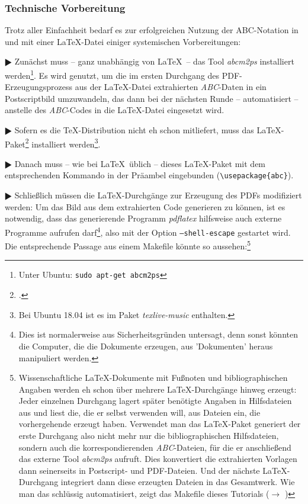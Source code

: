 \subsubsection{Technische Vorbereitung}

Trotz aller Einfachheit bedarf es zur erfolgreichen Nutzung der ABC-Notation
in und mit einer \LaTeX-Datei einiger systemischen Vorbereitungen:

$\RHD$ Zunächst muss -- ganz unabhängig von \LaTeX\ -- das Tool \textit{abcm2ps}
installiert werden\footnote{Unter Ubuntu: \texttt{sudo apt-get abcm2ps}}. Es
wird genutzt, um die im  ersten Durchgang des PDF-Erzeugungsprozess aus der
\LaTeX-Datei extrahierten \textit{ABC}-Daten in ein Postscriptbild
umzuwandeln, das dann bei der nächsten Runde -- automatisiert -- anstelle des
\textit{ABC}-Codes in die \LaTeX-Datei eingesetzt wird.
  
$\RHD$ Sofern es die \TeX-Distribution nicht eh schon mitliefert, muss das
\LaTeX-Paket\footcite[vgl.][\nopage wp]{CtanAbc2018a} installiert
werden\footnote{Bei Ubuntu 18.04 ist es im Paket \textit{texlive-music} enthalten.}.
  
$\RHD$ Danach muss -- wie bei \LaTeX\ üblich -- dieses
\LaTeX-Paket  mit dem entsprechenden Kommando in der Präambel
eingebunden (\texttt{\textbackslash{usepackage}\{abc\}}).
  
$\RHD$ Schließlich müssen die \LaTeX-Durchgänge zur Erzeugung des PDFs
modifiziert werden: Um das Bild aus dem extrahierten Code generieren zu können,
ist es notwendig, dass das generierende Programm \textit{pdflatex} hilfsweise auch
externe Programme aufrufen darf\footnote{Dies ist normalerweise aus
Sicherheitsgründen untersagt, denn sonst könnten die Computer, die die Dokumente
erzeugen, aus 'Dokumenten' heraus manipuliert werden.}, also mit der Option
\texttt{--shell-escape} gestartet wird. Die entsprechende Passage aus einem
Makefile könnte so aussehen:\footnote{Wissenschaftliche \LaTeX-Dokumente
mit Fußnoten und bibliographischen Angaben werden eh schon über mehrere
\LaTeX-Durchgänge hinweg erzeugt: Jeder einzelnen Durchgang lagert später
benötigte Angaben in Hilfsdateien aus und liest die, die er selbst verwenden
will, aus Dateien ein, die vorhergehende erzeugt haben.
Verwendet man das \LaTeX-Paket generiert der erste Durchgang also
nicht mehr nur die bibliographischen Hilfsdateien, sondern auch die
korrespondierenden \textit{ABC}-Dateien, für die er anschließend das externe Tool
\textit{abcm2ps} aufruft. Dies konvertiert die extrahierten Vorlagen dann
seinerseits in Postscript- und PDF-Dateien. Und der nächste
\LaTeX-Durchgang integriert dann diese erzeugten Dateien in das
Gesamtwerk. Wie man das schlüssig automatisiert, zeigt das Makefile dieses
Tutorials ($\rightarrow$
) } 

